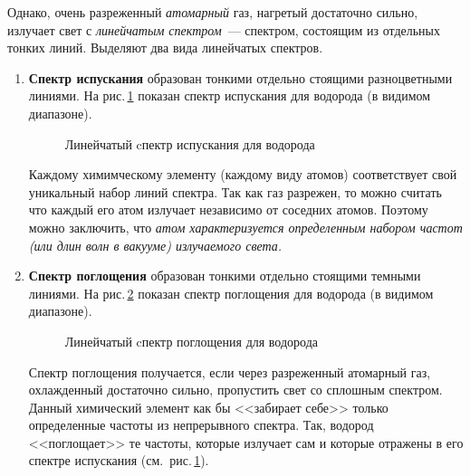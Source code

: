 \documentclass[main.tex]{subfiles}
\begin{document}
Однако, очень разреженный \emph{атомарный} газ, нагретый достаточно сильно, излучает свет с \emph{линейчатым спектром}~--- спектром, состоящим из отдельных тонких линий. Выделяют два вида линейчатых спектров. 
\begin{enumerate}
    \item \textbf{Спектр испускания} образован тонкими отдельно стоящими разноцветными линиями. На рис.\,\ref{fig:p203} показан спектр испускания для водорода (в видимом диапазоне). 

    \begin{figure}[H]
    \centering

\caption{Линейчатый cпектр испускания для водорода}
\label{fig:p203}
\end{figure}

    Каждому химимческому элементу (каждому виду атомов) соответствует свой уникальный набор линий спектра. Так как газ разрежен, то можно считать что каждый его атом излучает независимо от соседних атомов. Поэтому можно заключить, что \emph{атом характеризуется определенным набором частот (или длин волн в вакууме) излучаемого света.}
    
    \item \textbf{Спектр поглощения} образован тонкими отдельно стоящими темными линиями. На рис.\,\ref{fig:p204} показан спектр поглощения для водорода (в видимом диапазоне).  

    \begin{figure}[H]
    \centering

\caption{Линейчатый cпектр поглощения для водорода}
\label{fig:p204}
\end{figure}

    Спектр поглощения получается, если через разреженный атомарный газ, охлажденный достаточно сильно, пропустить свет со сплошным спектром. Данный химический элемент как бы <<забирает себе>> только определенные частоты из непрерывного спектра. Так, водород <<поглощает>> те частоты, которые излучает сам и которые отражены в его спектре испускания (см.~рис.\,\ref{fig:p203}).

    
\end{enumerate}
\end{document}

